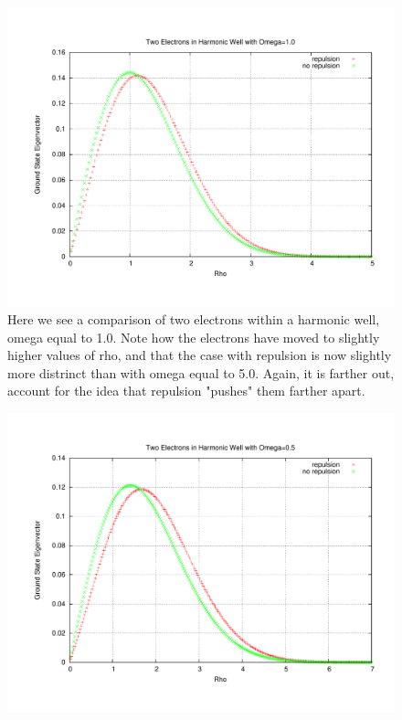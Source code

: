 \documentclass[11pt,a4paper]{article}
\begin{document}
{\begin{figure}
\end{figure}
\begin{figure}
\centering
\includegraphics[width=1.0\textwidth]{2e_100.pdf}
\caption{Here we see a comparison of two electrons within a harmonic well, omega equal to 1.0. Note how the electrons have moved to slightly higher values of rho, and that the case with repulsion is now slightly more distrinct than with omega equal to 5.0. Again, it is farther out, account for the idea that repulsion "pushes" them farther apart.}
\end{figure}
\begin{figure}
\centering
\includegraphics[width=1.0\textwidth]{2e_050.pdf}

\end{figure}}
\end{document}
